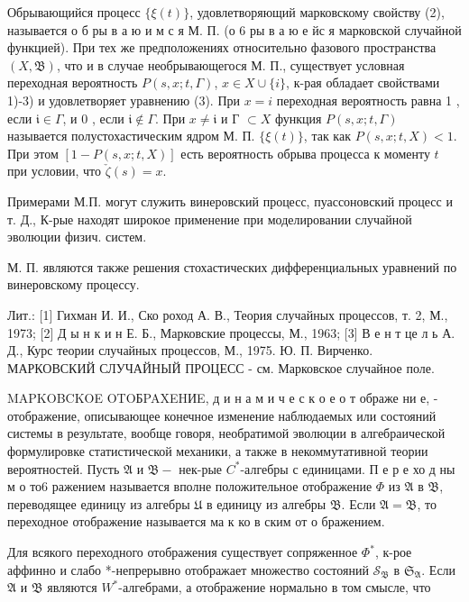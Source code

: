 \documentclass[10pt]{article}
\begin{document}
Обрывающийся процесс $\{\xi(t)\}$, удовлетворяющий марковскому свойству (2), называется о б ры в а ю и м с я М. П. (о 6 ры в а ю е йс я марковской случайной функцией). При тех же предположениях относительно фазового пространства $(X, \mathfrak{B})$, что и в случае необрывающегося М. П., существует условная переходная вероятность $P(s, x ; t, \Gamma)$, $x \in X \cup\{i\}$, к-рая обладает свойствами 1)-3) и удовлетворяет уравнению (3). При $x=i$ переходная вероятность равна 1 , если $\mathfrak{i} \in \Gamma$, и 0 , если $\mathfrak{i} \notin \Gamma$. При $x \neq \mathfrak{i}$ и Г $\subset X$ функция $P(s, x ; t, \Gamma)$ называется полустохастическим ядром М. П. $\{\xi(t)\}$, так как $P(s, x ; t, X)<1$. При этом $[1-P(s, x ; t, X)]$ есть вероятность обрыва процесса к моменту $t$ при условии, что $\check{\zeta}(s)=x$.



Примерами М.П. могут служить винеровский процесс, пуассоновский процесс и т. Д., К-рые находят широкое применение при моделировании случайной эволюции физич. систем.



М. П. являются также решения стохастических дифференциальных уравнений по винеровскому процессу.



Лит.: [1] Гихман И. И., Ско роход А. В., Теория случайных процессов, т. 2, М., 1973; [2] Д ы н к и н Е. Б., Марковские процессы, М., 1963; [3] В е н т це л ь А. Д., Курс теории случайных процессов, М., 1975. Ю. П. Вирченко. МАРКОВСКИЙ СЛУЧАЙНЫЙ ПРОЦЕСС - см. Марковское случайное поле.



MAPKOBCKOE OTOБPAXEHИE, д и н а м и ч е с к о е о т ображе ни е, - отображение, описывающее конечное изменение наблюдаемых или состояний системы в результате, вообще говоря, необратимой эволюции в алгебраической формулировке статистической механики, а также в некоммутативной теории вероятностей. Пусть $\mathfrak{A}$ и $\mathfrak{B}-$ нек-рые $C^{*}$-алгебры с единицами. П е р е хо д ны м о то6 ражением называется вполне положительное отображение $\Phi$ из $\mathfrak{A}$ в $\mathfrak{B}$, переводящее единицу из алгебры $\mathfrak{U}$ в единицу из алгебры $\mathfrak{B}$. Если $\mathfrak{A}=\mathfrak{B}$, то переходное отображение называется ма к ко в ским от о бражением.



Для всякого переходного отображения существует сопряженное $\Phi^{*}$, к-рое аффинно и слабо *-непрерывно отображает множество состояний $\mathscr{S}_{\mathfrak{B}}$ в $\mathfrak{S}_{\mathfrak{A}}$. Если $\mathfrak{A}$ и $\mathfrak{B}$ являются $W^{*}$-алгебрами, а отображение нормально в том смысле, что
\end{document}
